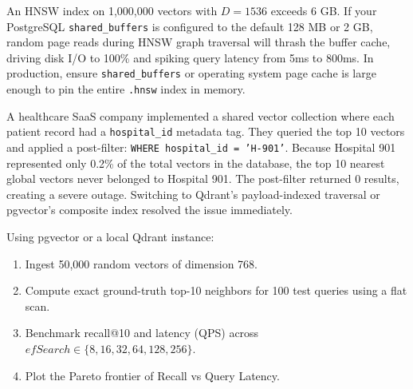 \begin{productionwarningbox}
An HNSW index on 1,000,000 vectors with $D=1536$ exceeds 6 GB. If your PostgreSQL \texttt{shared\_buffers} is configured to the default 128 MB or 2 GB, random page reads during HNSW graph traversal will thrash the buffer cache, driving disk I/O to 100\% and spiking query latency from 5ms to 800ms. In production, ensure \texttt{shared\_buffers} or operating system page cache is large enough to pin the entire \texttt{.hnsw} index in memory.
\end{productionwarningbox}

\begin{realworldbox}
A healthcare SaaS company implemented a shared vector collection where each patient record had a \texttt{hospital\_id} metadata tag. They queried the top 10 vectors and applied a post-filter: \texttt{WHERE hospital\_id = 'H-901'}.
Because Hospital 901 represented only 0.2\% of the total vectors in the database, the top 10 nearest global vectors never belonged to Hospital 901. The post-filter returned 0 results, creating a severe outage.
Switching to Qdrant's payload-indexed traversal or pgvector's composite index resolved the issue immediately.
\end{realworldbox}

\begin{tryityourselfbox}
Using pgvector or a local Qdrant instance:
\begin{enumerate}
  \item Ingest 50,000 random vectors of dimension 768.
  \item Compute exact ground-truth top-10 neighbors for 100 test queries using a flat scan.
  \item Benchmark recall@10 and latency (QPS) across $efSearch \in \{8, 16, 32, 64, 128, 256\}$.
  \item Plot the Pareto frontier of Recall vs Query Latency.
\end{enumerate}
\end{tryityourselfbox}

